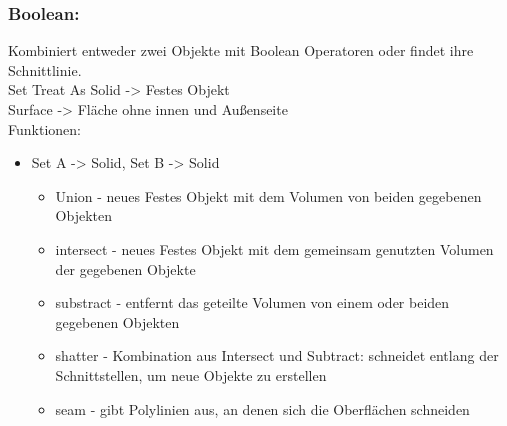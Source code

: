 \documentclass[paper=a4,fontsize=12pt,ngerman]{scrartcl}
\begin{document}
	\subsubsection*{Boolean:}
	Kombiniert entweder zwei Objekte mit Boolean Operatoren oder findet ihre Schnittlinie.\\
	
	Set	Treat As Solid -> Festes Objekt\\
	Surface -> Fläche ohne innen und Außenseite\\
	Funktionen:
	\begin{itemize}
		\item Set A -> Solid, Set B -> Solid
		\begin{itemize}
			\item Union - neues Festes Objekt mit dem Volumen von beiden gegebenen Objekten
			\item intersect - neues Festes Objekt mit dem gemeinsam genutzten Volumen der gegebenen Objekte
			\item substract - entfernt das geteilte Volumen von einem oder beiden gegebenen Objekten
			\item shatter - Kombination aus Intersect und Subtract: schneidet entlang der Schnittstellen, um neue Objekte zu erstellen
			\item seam - gibt Polylinien aus, an denen sich die Oberflächen schneiden
		\end{itemize}
		

\end{itemize}
\end{document}
